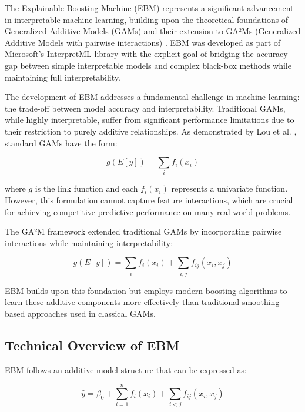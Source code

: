 \documentclass[12pt]{article}
\begin{document}
The Explainable Boosting Machine (EBM) represents a significant advancement in interpretable machine learning, building upon the theoretical foundations of Generalized Additive Models (GAMs) \cite{hastie1990} and their extension to GA²Ms (Generalized Additive Models with pairwise interactions) \cite{lou2013}. EBM was developed as part of Microsoft's InterpretML library with the explicit goal of bridging the accuracy gap between simple interpretable models and complex black-box methods while maintaining full interpretability.

The development of EBM addresses a fundamental challenge in machine learning: the trade-off between model accuracy and interpretability. Traditional GAMs, while highly interpretable, suffer from significant performance limitations due to their restriction to purely additive relationships. As demonstrated by Lou et al. \cite{lou2013}, standard GAMs have the form:

\begin{equation}
g(E[y]) = \sum_{i} f_i(x_i)
\end{equation}

where $g$ is the link function and each $f_i(x_i)$ represents a univariate function. However, this formulation cannot capture feature interactions, which are crucial for achieving competitive predictive performance on many real-world problems.

The GA²M framework \cite{lou2013} extended traditional GAMs by incorporating pairwise interactions while maintaining interpretability:

\begin{equation}
g(E[y]) = \sum_{i} f_i(x_i) + \sum_{i,j} f_{ij}(x_i, x_j)
\end{equation}

EBM builds upon this foundation but employs modern boosting algorithms to learn these additive components more effectively than traditional smoothing-based approaches used in classical GAMs.

\subsection{Technical Overview of EBM}

EBM follows an additive model structure that can be expressed as:

\begin{equation}
\hat{y} = \beta_0 + \sum_{i=1}^{n} f_i(x_i) + \sum_{i<j} f_{ij}(x_i, x_j)
\end{equation}
\end{document}
